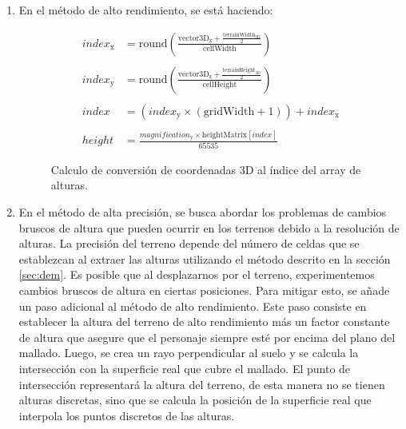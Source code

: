 \documentclass[a4paper, 11pt]{book}
\begin{document}
\begin{enumerate}
    \item En el método de alto rendimiento, se está haciendo:
    \begin{figure}[h]
        \begin{align*}
        index_{\text{x}} &=\mathbf{\mathrm{round}}\left(\frac{\mathbf{\mathrm{vector3D}}_{\text{x}} + \frac{\mathbf{\mathrm{terrainWidth}}_{\text{3D}}}{2}}{\mathbf{\mathrm{cellWidth}}}\right) \\\\
        index_{\text{y}} &=\mathbf{\mathrm{round}}\left(\frac{\mathbf{\mathrm{vector3D}}_{\text{z}} + \frac{\mathbf{\mathrm{terrainHeight}}_{\text{3D}}}{2}}{\mathbf{\mathrm{cellHeight}}}\right) \\\\
        index_{} &=(index_{\text{y}} \times (\mathbf{\mathrm{gridWidth}} + 1 )) + index_{\text{x}} \\\\
        height{} &=\frac{magnification_{\text{y}} \times \mathbf{\mathrm{heightMatrix}}[index_{}]}{65535}
        \end{align*}
    \caption{Calculo de conversión de coordenadas 3D al índice del array de alturas.}
    \label{formula:calculoIndiceAlturas}
    \end{figure}
    \item En el método de alta precisión, se busca abordar los problemas de cambios bruscos de altura que pueden ocurrir en los terrenos debido a la resolución de alturas.
    La precisión del terreno depende del número de celdas que se establezcan al extraer las alturas utilizando el método descrito en la sección \ref{sec:dem}.
    Es posible que al desplazarnos por el terreno, experimentemos cambios bruscos de altura en ciertas posiciones. Para mitigar esto, se añade un paso adicional al método de alto rendimiento.
    Este paso consiste en establecer la altura del terreno de alto rendimiento más un factor constante de altura que asegure que el personaje siempre esté por encima del plano del mallado. Luego, se crea un rayo perpendicular al suelo y se calcula la intersección con la superficie real que cubre el mallado. 
    El punto de intersección representará la altura del terreno, de esta manera no se tienen alturas discretas, sino que se calcula la posición de la superficie real que interpola los puntos discretos de las alturas.
\end{enumerate}
\end{document}
